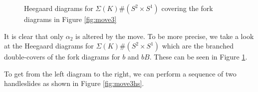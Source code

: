 \documentclass[11pt]{article}
\theoremstyle{plain} \newtheorem{thm}{Theorem}[subsection]
\theoremstyle{plain} \newtheorem{cor}[thm]{Corollary}
\theoremstyle{plain} \newtheorem{prop}[thm]{Proposition}
\theoremstyle{plain} \newtheorem{conj}[thm]{Conjecture}
\theoremstyle{plain} \newtheorem{lem}[thm]{Lemma}
\theoremstyle{definition} \newtheorem{df}[thm]{Definition}
\theoremstyle{remark} \newtheorem{rmk}[thm]{Remark}
\theoremstyle{remark} \newtheorem{obs}[thm]{Observation}
\newcommand{\DBCs}[1]{\Sigma(#1)\#(S^{2}\times S^{1})}
\begin{document}
\begin{figure}[h!]
\centering
{}\qquad
{}
\caption[Heegaard diagrams covering Figure \ref{fig:move3}]{Heegaard diagrams for  $\DBCs{K}$ covering the fork diagrams in Figure \ref{fig:move3}}
\label{fig:move3hd}
\end{figure}

It is clear that only $\alpha_{2}$ is altered by the move.  To be more precise, we take a look at the Heegaard diagrams for $\DBCs{K}$ which are the branched double-covers of the fork diagrams for $b$ and $b B$.  These can be seen in Figure \ref{fig:move3hd}.

To get from the left diagram to the right, we can perform a sequence of two handleslides as shown in Figure \ref{fig:move3hs}.
\end{document}
